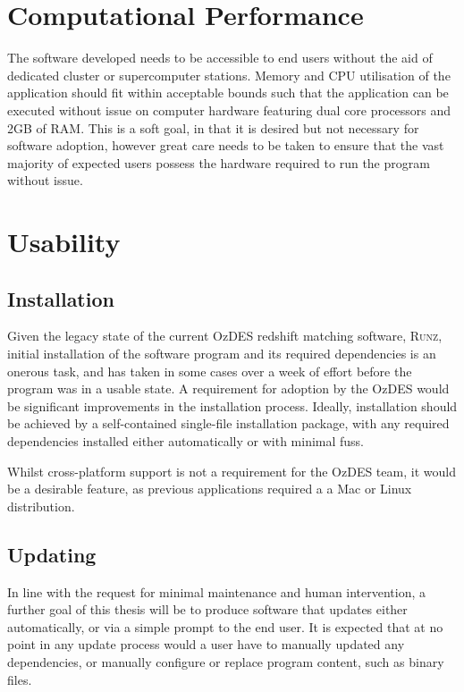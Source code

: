 \documentclass[titlesmallcaps, examinerscopy, copyrightpage]{uqthesis}
\begin{document}
\section{Computational Performance}

The software developed needs to be accessible to end users without the aid of dedicated cluster or supercomputer stations. Memory and CPU utilisation of the application should fit within acceptable bounds such that the application can be executed without issue on computer hardware featuring dual core processors and 2GB of RAM. This is a soft goal, in that it is desired but not necessary for software adoption, however great care needs to be taken to ensure that the vast majority of expected users possess the hardware required to run the program without issue.

\section{Usability}

\subsection{Installation}

Given the legacy state of the current OzDES redshift matching software, \textsc{Runz}, initial installation of the software program and its required dependencies is an onerous task, and has taken in some cases over a week of effort before the program was in a usable state. A requirement for adoption by the OzDES would be significant improvements in the installation process. Ideally, installation should be achieved by a self-contained  single-file installation package, with any required dependencies installed either automatically or with minimal fuss.

Whilst cross-platform support is not a requirement for the OzDES team, it would be a desirable feature, as previous applications required a a Mac or Linux distribution.

\subsection{Updating}

In line with the request for minimal maintenance and human intervention, a further goal of this thesis will be to produce software that updates either automatically, or via a simple prompt to the end user. It is expected that at no point in any update process would a user have to manually updated any dependencies, or manually configure or replace program content, such as binary files.
\end{document}
